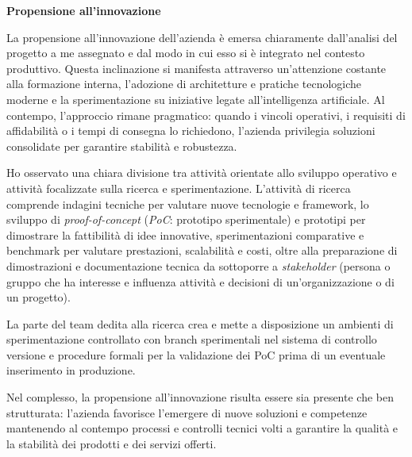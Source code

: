 \medskip
\noindent\textbf{Propensione all'innovazione}

La propensione all'innovazione dell'azienda è emersa chiaramente dall'analisi del progetto a me assegnato e dal modo in cui esso si è integrato nel contesto produttivo. 
Questa inclinazione si manifesta attraverso un'attenzione costante alla formazione interna, l'adozione di architetture e pratiche tecnologiche moderne e la sperimentazione su 
iniziative legate all'intelligenza artificiale. Al contempo, l'approccio rimane pragmatico: quando i vincoli operativi, i requisiti di affidabilità o i tempi di consegna lo richiedono, 
l'azienda privilegia soluzioni consolidate per garantire stabilità e robustezza.

Ho osservato una chiara divisione tra attività orientate allo sviluppo operativo e attività focalizzate sulla ricerca e sperimentazione. 
L'attività di ricerca comprende indagini tecniche per valutare nuove tecnologie e framework, lo sviluppo di \emph{proof-of-concept} (\emph{PoC}: prototipo sperimentale) e 
prototipi per dimostrare la fattibilità di idee innovative, sperimentazioni comparative e benchmark per valutare prestazioni, scalabilità e costi, oltre alla preparazione di dimostrazioni e 
documentazione tecnica da sottoporre a \emph{stakeholder} (persona o gruppo che ha interesse e influenza attività e decisioni di un'organizzazione o di un progetto).

La parte del team dedita alla ricerca crea e mette a disposizione un ambienti di sperimentazione controllato con 
branch sperimentali nel sistema di controllo versione e procedure formali per la validazione dei PoC prima di un eventuale inserimento in produzione. 

Nel complesso, la propensione all'innovazione risulta essere sia presente che ben strutturata: l'azienda favorisce l'emergere di nuove soluzioni e competenze mantenendo al contempo processi e controlli tecnici volti a 
garantire la qualità e la stabilità dei prodotti e dei servizi offerti.